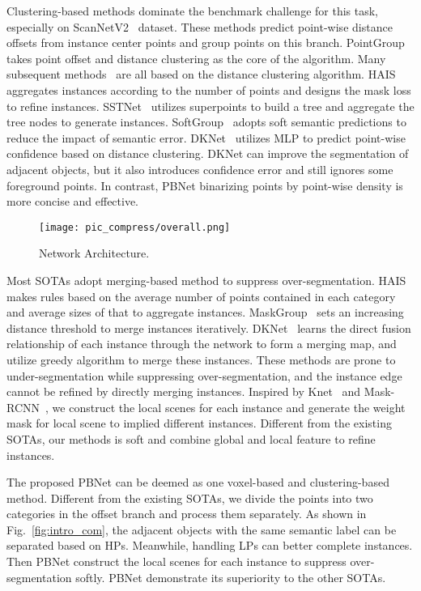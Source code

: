 \documentclass[10pt,twocolumn,letterpaper]{article}
\begin{document}
Clustering-based methods dominate the benchmark challenge for this task, especially on ScanNetV2~\cite{dai2017scannet} dataset. These methods predict point-wise distance offsets from instance center points and group points on this branch. PointGroup~\cite{jiang2020pointgroup} takes point offset and distance clustering as the core of the algorithm. Many subsequent methods~\cite{he2021dyco3d,liu2021hida,chen2021hierarchical, vu2022softgroup, wu2022dknet} are all based on the distance clustering algorithm. HAIS~\cite{chen2021hierarchical} aggregates instances according to the number of points and designs the mask loss to refine instances. SSTNet~\cite{liang2021instance} utilizes superpoints to build a tree and aggregate the tree nodes to generate instances. SoftGroup~\cite{vu2022softgroup} adopts soft semantic predictions to reduce the impact of semantic error. DKNet~\cite{wu2022dknet} utilizes MLP to predict point-wise confidence based on distance clustering. DKNet can improve the segmentation of adjacent objects, but it also introduces confidence error and still ignores some foreground points. In contrast, PBNet binarizing points by point-wise density is more concise and effective.
\begin{figure*}[tp]
  \centering
  \texttt{[image:  pic\_compress/overall.png]}
   \caption{Network Architecture.}
   \label{fig:net}
\end{figure*}

Most SOTAs adopt merging-based method to suppress over-segmentation. HAIS~\cite{chen2021hierarchical} makes rules based on the average number of points contained in each category and average sizes of that to aggregate instances. MaskGroup~\cite{zhong2022maskgroup} sets an increasing distance threshold to merge instances iteratively. DKNet~\cite{wu2022dknet} learns the direct fusion relationship of each instance through the network to form a merging map, and utilize greedy algorithm to merge these instances. These methods are prone to under-segmentation while suppressing over-segmentation, and the instance edge cannot be refined by directly merging instances. Inspired by Knet~\cite{zhang2021k} and Mask-RCNN~\cite{he2017mask}, we construct the local scenes for each instance and generate the weight mask for local scene to implied different instances. Different from the existing SOTAs,  our methods is soft and combine global and local feature to refine instances. 

The proposed PBNet can be deemed as one voxel-based and clustering-based method. Different from the existing SOTAs, we divide the points into two categories  in the offset branch and process them separately. As shown in Fig.~\ref{fig:intro_com}, the adjacent objects with the same semantic label can be separated based on HPs. Meanwhile, handling LPs can better complete instances. Then PBNet construct the local scenes for each instance to suppress over-segmentation softly. PBNet demonstrate 
its superiority  to the other SOTAs.
\end{document}
